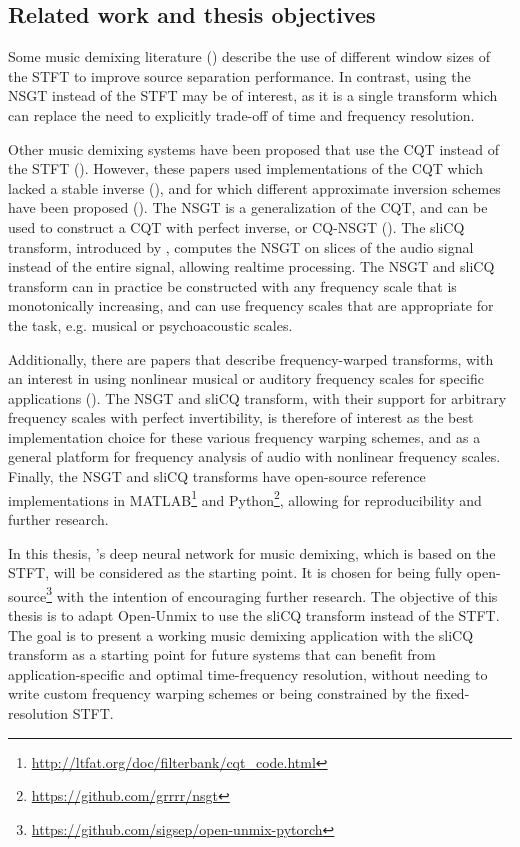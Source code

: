 \documentclass[report.tex]{subfiles}
\begin{document}
\subsection{Related work and thesis objectives}

Some music demixing literature (\cite{fitzgerald1, driedger, tftradeoff1, tftradeoff2}) describe the use of different window sizes of the STFT to improve source separation performance. In contrast, using the NSGT instead of the STFT may be of interest, as it is a single transform which can replace the need to explicitly trade-off of time and frequency resolution.

Other music demixing systems have been proposed that use the CQT instead of the STFT (\cite{fitzgerald2, cqtseparation, bettermusicsep}). However, these papers used implementations of the CQT which lacked a stable inverse (\cite{lackinverse}), and for which different approximate inversion schemes have been proposed (\cite{klapuricqt, fitzgeraldcqt}). The NSGT is a generalization of the CQT, and can be used to construct a CQT with perfect inverse, or CQ-NSGT (\cite{invertiblecqt, variableq1}). The sliCQ transform, introduced by \textcite{slicq}, computes the NSGT on slices of the audio signal instead of the entire signal, allowing realtime processing. The NSGT and sliCQ transform can in practice be constructed with any frequency scale that is monotonically increasing, and can use frequency scales that are appropriate for the task, e.g. musical or psychoacoustic scales.

Additionally, there are papers that describe frequency-warped transforms, with an interest in using nonlinear musical or auditory frequency scales for specific applications (\cite{warped1, warped2, earlywarped1, earlywarped2, warpedcomparison, warpedpsycho}). The NSGT and sliCQ transform, with their support for arbitrary frequency scales with perfect invertibility, is therefore of interest as the best implementation choice for these various frequency warping schemes, and as a general platform for frequency analysis of audio with nonlinear frequency scales. Finally, the NSGT and sliCQ transforms have open-source reference implementations in MATLAB\footnote{\url{http://ltfat.org/doc/filterbank/cqt_code.html}} and Python\footnote{\url{https://github.com/grrrr/nsgt}}, allowing for reproducibility and further research.

In this thesis, \textcite{umx}'s deep neural network for music demixing, which is based on the STFT, will be considered as the starting point. It is chosen for being fully open-source\footnote{\url{https://github.com/sigsep/open-unmix-pytorch}} with the intention of encouraging further research. The objective of this thesis is to adapt Open-Unmix to use the sliCQ transform instead of the STFT. The goal is to present a working music demixing application with the sliCQ transform as a starting point for future systems that can benefit from application-specific and optimal time-frequency resolution, without needing to write custom frequency warping schemes or being constrained by the fixed-resolution STFT.
\end{document}
